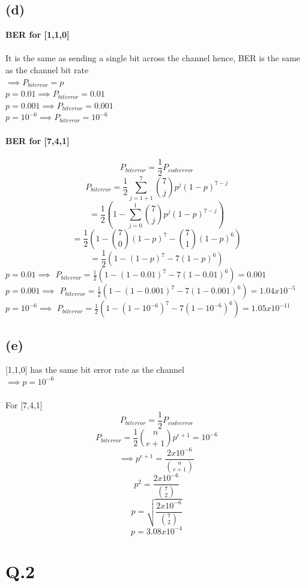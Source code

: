 \documentclass[a4paper,11pt]{article}
\begin{document}
\subsection*{(d)}
\textbf{BER for [1,1,0]}\\\\
It is the same as sending a single bit across the channel hence, BER is the same as the channel bit rate\\
$\implies P_{biterror}=p$\\
$ p = 0.01 \implies P_{biterror} = 0.01$\\
$ p = 0.001 \implies P_{biterror} = 0.001$\\
$ p = 10^{-6} \implies P_{biterror} = 10^{-6}$\\\\
\textbf{BER for [7,4,1]}\\\\
$$P_{biterror}  = \frac{1}{2}P_{codeerror}$$
$$ P_{biterror} = \frac{1}{2}\sum_{j=1+1}^{7} \binom{7}{j}p^j(1-p)^{7-j}$$
$$ = \frac{1}{2}(1-\sum_{j=0}^{1} \binom{7}{j}p^j(1-p)^{7-j})$$
$$ = \frac{1}{2}(1- \binom{7}{0}(1-p)^7 - \binom{7}{1}(1-p)^6)$$
$$ = \frac{1}{2}(1- (1-p)^7 - 7(1-p)^6)$$
$p = 0.01 \implies$ $P_{biterror} = \frac{1}{2}(1- (1-0.01)^7 - 7(1-0.01)^6) = 0.001$\\
$p = 0.001 \implies$ $P_{biterror} = \frac{1}{2}(1- (1-0.001)^7 - 7(1-0.001)^6) = 1.04x10^{-5}$\\
$p = 10^{-6} \implies$ $P_{biterror} = \frac{1}{2}(1- (1- 10^{-6})^7 - 7(1- 10^{-6})^6) =  1.05x10^{-11}$
\subsection*{(e)}
[1,1,0] has the same bit error rate as the channel\\
$\implies p = 10^{-6}$  \\\\
For [7,4,1]\\
$$P_{biterror} = \frac{1}{2}P_{codeerror}$$
$$P_{biterror} = \frac{1}{2}\binom{n}{e+1}p^{e+1} = 10^{-6}$$
$$\implies p^{e+1} = \frac{2x10^{-6}}{\binom{n}{e+1}}$$
$$ p^{2} = \frac{2x10^{-6}}{\binom{7}{2}}$$
$$p = \sqrt{\frac{2x10^{-6}}{\binom{7}{2}}}$$
$$p = 3.08x10^{-4}$$
\newpage
\clearpage
\section*{Q.2}
\end{document}

